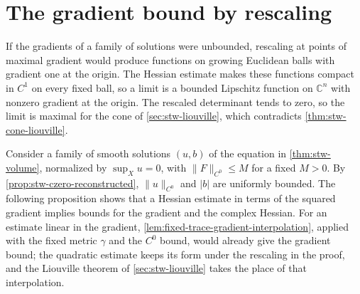 \section{The gradient bound by rescaling}
\label{sec:stw-gradient-reduction}

If the gradients of a family of solutions were unbounded, rescaling at points of maximal gradient would produce functions on growing Euclidean balls with gradient one at the origin. The Hessian estimate makes these functions compact in $C^1$ on every fixed ball, so a limit is a bounded Lipschitz function on $\mathbb C^n$ with nonzero gradient at the origin. The rescaled determinant tends to zero, so the limit is maximal for the cone of \cref{sec:stw-liouville}, which contradicts \cref{thm:stw-cone-liouville}.

Consider a family of smooth solutions $(u,b)$ of the equation in \cref{thm:stw-volume}, normalized by $\sup_Xu=0$, with $\|F\|_{C^0}\leq M$ for a fixed $M>0$. By \cref{prop:stw-czero-reconstructed}, $\|u\|_{C^0}$ and $|b|$ are uniformly bounded. The following proposition shows that a Hessian estimate in terms of the squared gradient implies bounds for the gradient and the complex Hessian. For an estimate linear in the gradient, \cref{lem:fixed-trace-gradient-interpolation}, applied with the fixed metric $\gamma$ and the $C^0$ bound, would already give the gradient bound; the quadratic estimate keeps its form under the rescaling in the proof, and the Liouville theorem of \cref{sec:stw-liouville} takes the place of that interpolation.


